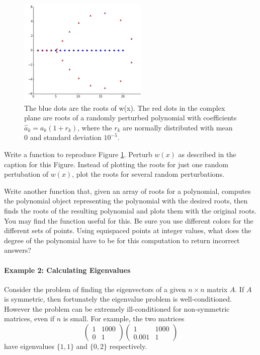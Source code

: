 \begin{figure}[h!]
\centering
\includegraphics[height=2in]{wilkinsonpolynomial.pdf}
\caption{The blue dots are the roots of w(x). The red dots in the complex plane are roots of a randomly perturbed polynomial with coefficients $\hat{a}_k = a_k(1+r_k)$, where the $r_k$ are normally distributed with mean $0$ and standard deviation $10^{-5}$.}
\label{fig:wilkinsonpolynomial}
\end{figure}

\begin{problem}
Write a function to reproduce Figure \ref{fig:wilkinsonpolynomial}.
Perturb $w(x)$ as described in the caption for this Figure.
Instead of plotting the roots for just one random pertubation of $w(x)$, plot the roots for several random perturbations.

Write another function that, given an array of roots for a polynomial, computes the polynomial object representing the polynomial with the desired roots, then finds the roots of the resulting polynomial and plots them with the original roots.
You may find the  function useful for this.
Be sure you use different colors for the different sets of points.
Using equispaced points at integer values, what does the degree of the polynomial have to be for this computation to return incorrect answers?
\end{problem}

\paragraph{Example 2: Calculating Eigenvalues}

Consider the problem of finding the eigenvectors of a given $n \times n$ matrix $A$. If $A$ is symmetric, then fortunately the eigenvalue problem is well-conditioned. However the problem can be extremely ill-conditioned for non-symmetric matrices, even if $n$ is small. For example, the two matrices 
\[ \left( \begin{array}{cc}
1 & 1000 \\
0 & 1
\end{array} \right)
%
\left( \begin{array}{cc}
1 & 1000 \\
0.001 & 1
\end{array} \right)
\]
have eigenvalues $\{ 1,1\}$ and $\{0,2 \}$ respectively.

